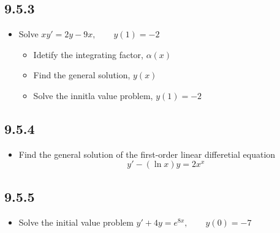 \begin{itemize}
  \subsection{9.5.3}
  \begin{itemize}
    \item Solve \(xy' = 2y - 9x, \qquad y(1) = -2\)
      \begin{itemize}
        \item Idetify the integrating factor, \(\alpha(x)\)

        \item Find the general solution, \(y(x)\)

        \item Solve the innitla value problem, \(y(1) = -2\)
      \end{itemize}
  \end{itemize}

  \subsection{9.5.4}
  \begin{itemize}
    \item Find the general solution of the first-order linear differetial
      equation
      \[%
        y' - (\ln x)y = 2x^{x}
      \]%
  \end{itemize}

  \subsection{9.5.5}
  \begin{itemize}
    \item Solve the initial value problem \(y' + 4y = e^{8x}, \qquad y(0) = -7
      \)
  \end{itemize}




\end{itemize}

